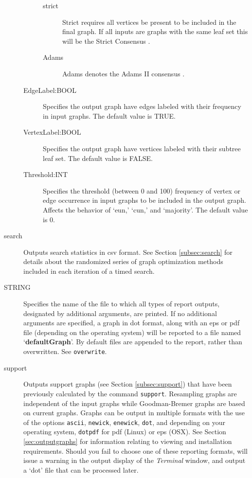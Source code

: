 \begin{description}
\begin{description}
\begin{description}
				\item[strict] Strict requires all vertices be present to be included in the final graph. 
				If all inputs are graphs with the same leaf set this will be the Strict Consensus 
				\citep{Schuhandpolhemus1980}. 

				\item[Adams] Adams denotes the Adams II consensus \citep{Adams1972}.
			\end{description}
		
			\item [EdgeLabel:BOOL] Specifies the output graph have edges 
			labeled with their frequency in input graphs. The default value is TRUE.			
			
			\item [VertexLabel:BOOL] Specifies the output graph have vertices 
			labeled with their subtree leaf set. The default value is FALSE.
						
		\item [Threshold:INT] Specifies the threshold  (between 0 and 100) 
		frequency of vertex or edge occurrence in input graphs to be included 
		in the output graph. Affects the behavior of `eun,' `cun,' and `majority'. The default value
		is $0$.
		\end{description}	
				
		\item[search] Outputs search statistics in csv format. See Section 
		\ref{subsec:search} for details about the randomized series of graph 
		optimization methods included in each iteration of a timed search.
			
		\item [STRING] Specifies the name of the file to which all types of report 
		outputs, designated by additional arguments, are printed. If no additional 
		arguments are specified, a graph in dot format, along with an eps or pdf 
		file (depending on the operating system) will be reported to a file named 
		`\textbf{defaultGraph}'. By default files are appended to the report, rather 
		than overwritten. See \texttt{overwrite}.
				
		\item[support] Outputs support graphs (see Section \ref{subsec:support})
		that have been previously calculated by the command \texttt{support}. 
		Resampling graphs \citep{Farrisetal1996} are independent of the input graphs 
		while Goodman-Bremer graphs \citep{Goodmanetal1982, bremer1994} are 
		based on current graphs. Graphs can be output in multiple formats with the
		use of the options \texttt{ascii}, \texttt{newick}, \texttt{enewick}, \texttt{dot}, 
		and depending on your operating system, \texttt{dotpdf} for pdf (Linux) or 
		eps (OSX). See Section \ref{sec:outputgraphs} for information relating to 
		viewing and installation requirements. Should you fail to choose one of 
		these reporting formats, \phyg will issue a warning in the output display 
		of the \textit{Terminal} window, and output a `dot' file that can be processed 
		later.
		

\end{description}
